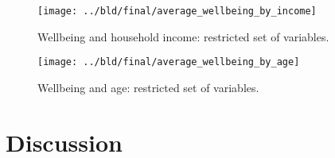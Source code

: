 \documentclass[11pt, a4paper, leqno]{article}
\begin{document}
\begin{figure}[htbp]
    \centering
    \texttt{[image: ../bld/final/average\_wellbeing\_by\_income]}
    \caption{Wellbeing and household income: restricted set of variables.}
    \label{fig:average_wellbeing_by_income}
\end{figure}

\begin{figure}[htbp]
    \centering
    \texttt{[image: ../bld/final/average\_wellbeing\_by\_age]}
    \caption{Wellbeing and age: restricted set of variables.}
    \label{fig:average_wellbeing_by_age}
\end{figure}



\section{Discussion} %
\label{sec:discussion}





\printbibliography
{}



\end{document}
